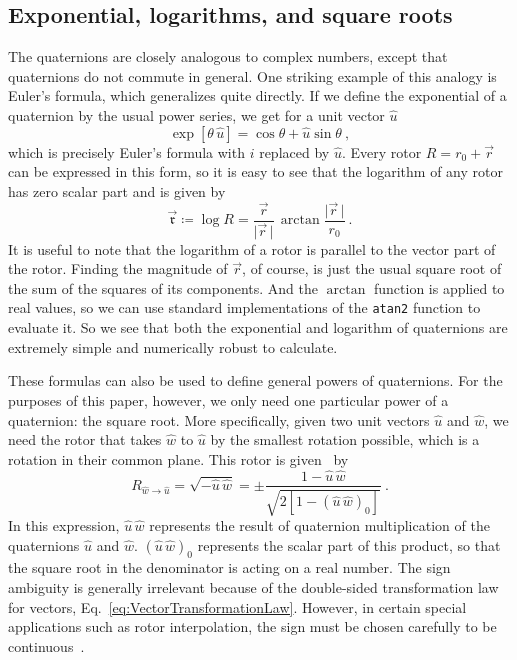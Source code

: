 \documentclass[aps,prd,amsmath,floatfix,twocolumn,superscriptaddress,nofootinbib,showpacs]{revtex4-1}
\newcommand{\abs}[1]{\lvert#1\rvert}
\newcommand{\defined}{\coloneqq}
\begin{document}
\subsection{Exponential, logarithms, and square roots}
\label{sec:Exponentiallogarithmsandsquareroots}
The quaternions are closely analogous to complex numbers, except that
quaternions do not commute in general.  One striking example of this
analogy is Euler's formula, which generalizes quite directly.  If we
define the exponential of a quaternion by the usual power series, we
get for a unit vector $\hat u$
\begin{equation}
  \label{eq:QuaternionExponential}
  \exp[\theta\, \hat{u}] = \cos\theta + \hat{u} \sin\theta~,
\end{equation}
which is precisely Euler's formula with $i$ replaced by $\hat{u}$.
Every rotor $R=r_0+\vec r$ can be expressed in this form, so it is
easy to see that the logarithm of any rotor has zero scalar part and
is given by
\begin{equation}
  \label{eq:RotorLogarithm}
  \vec{\mathfrak{r}} \defined \log R = \frac{\vec{r}}
  {\abs{\vec{r}\,}}\, \arctan \frac{\abs{\vec{r}\,}} {r_{0}}~.
\end{equation}
It is useful to note that the logarithm of a rotor is parallel to the
vector part of the rotor.  Finding the magnitude of $\vec{r}$, of
course, is just the usual square root of the sum of the squares of its
components.  And the $\arctan$ function is applied to real values, so
we can use standard implementations of the \texttt{atan2} function to
evaluate it.  So we see that both the exponential and logarithm of
quaternions are extremely simple and numerically robust to calculate.

These formulas can also be used to define general powers of
quaternions.  For the purposes of this paper, however, we only need
one particular power of a quaternion: the square root.  More
specifically, given two unit vectors $\hat{u}$ and $\hat{w}$, we need
the rotor that takes $\hat{w}$ to $\hat{u}$ by the smallest rotation
possible, which is a rotation in their common plane.  This rotor is
given~\cite{Boyle:2013} by
\begin{equation}
  \label{eq:RotorSquareRoot}
  R_{\hat{w} \to \hat{u}} = \sqrt{-\hat{u}\, \hat{w}} = \pm \frac{1 -
    \hat{u}\, \hat{w}} {\sqrt{2[1-(\hat{u}\, \hat{w})_{0}]}}~.
\end{equation}
In this expression, $\hat u\,\hat w$ represents the result of
quaternion multiplication of the quaternions $\hat u$ and $\hat w$.
$(\hat u\,\hat w)_0$ represents the scalar part of this product, so
that the square root in the denominator is acting on a real number.
The sign ambiguity is generally irrelevant because of the double-sided
transformation law for vectors,
Eq.~\eqref{eq:VectorTransformationLaw}.  However, in certain special
applications such as rotor interpolation, the sign must be chosen
carefully to be continuous~\cite{Boyle:2013}.
\end{document}
